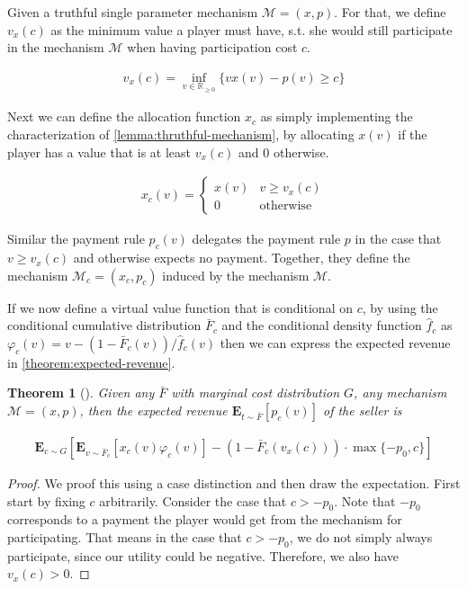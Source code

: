 \documentclass[11pt,a4paper]{article}
\newtheorem{theorem}{Theorem}
\newcommand{\RR}{\ensuremath{\mathbb{R}}}
\newcommand{\1}[1]{\mbox{\rm\bf 1}_{#1}}
\begin{document}
\begin{section}{}
 Given a truthful single parameter mechanism $\mathcal{M}=(x,p)$.
 For that, we define $v_x(c)$ as the minimum value a player must have, s.t. she would still participate in the mechanism $\mathcal{M}$ when having participation cost $c$.

 \begin{align*}
     v_x(c) = \inf_{v \in \RR_{\geq 0}} \{vx(v) - p(v) \geq c\}
 \end{align*}

 Next we can define the allocation function $x_c$ as simply implementing the characterization of \autoref{lemma:thruthful-mechanism},
 by allocating $x(v)$ if the player has a value that is at least $v_x(c)$ and $0$ otherwise.

 \begin{align*}
     x_c(v) = \begin{cases}
                  x(v) & v \geq v_x(c)    \\
                  0    & \text{otherwise}
              \end{cases}
 \end{align*}

 Similar the payment rule $p_c(v)$ delegates the payment rule $p$ in the case that $v \geq v_x(c)$ and otherwise expects no payment.
 Together, they define the mechanism $\mathcal{M}_c = (x_c, p_c)$ induced by the mechanism $\mathcal{M}$.

 If we now define a virtual value function that is conditional on $c$, by using the conditional cumulative distribution $\bar{F}_c$ and the conditional density function $\hat{f}_c$ as
 $\varphi_c(v) = v - (1- \bar{F}_c(v)) / \hat{f}_c(v)$ then we can express the expected revenue in \autoref{theorem:expected-revenue}.

 \begin{theorem}[\cite{primary}]
     \label{theorem:expected-revenue}
     Given any $\bar{F}$ with marginal cost distribution $G$, any mechanism $\mathcal{M}=(x,p)$, then the expected revenue $\mathbf{E}_{t \sim \bar{F}}\left[p_c(v)\right]$ of the seller is

     \begin{align*}
         \mathbf{E}_{c \sim G}\left[\mathbf{E}_{v\sim\bar{F}_c}\left[x_c(v)\varphi_c(v)\right] - (1-\bar{F}_c(v_x(c))) \cdot \max\{-p_0,c\}\right]
     \end{align*}
 \end{theorem}

 \begin{proof}
     We proof this using a case distinction and then draw the expectation.
     First start by fixing $c$ arbitrarily.
     Consider the case that $c > -p_0$. Note that $-p_0$ corresponds to a payment the player would get from the mechanism for participating.
     That means in the case that $c > -p_0$, we do not simply always participate, since our utility could be negative. Therefore, we also have $v_x(c) > 0$.


\end{proof}
\end{section}
\end{document}
